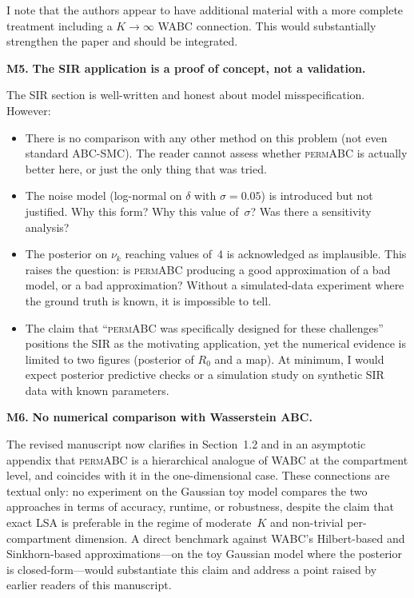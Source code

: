 \documentclass[11pt,a4paper]{article}
\newcommand{\major}[1]{\textbf{\color{red!70!black}M#1.}}
\begin{document}
I note that the authors appear to have additional material with a more complete treatment including a $K \to \infty$ WABC connection. This would substantially strengthen the paper and should be integrated.

\major{5} \textbf{The SIR application is a proof of concept, not a validation.}

The SIR section is well-written and honest about model misspecification. However:
\begin{itemize}[nosep]
    \item There is no comparison with any other method on this problem (not even standard ABC-SMC). The reader cannot assess whether \textsc{permABC} is actually better here, or just the only thing that was tried.
    \item The noise model (log-normal on $\delta$ with $\sigma = 0.05$) is introduced but not justified. Why this form? Why this value of~$\sigma$? Was there a sensitivity analysis?
    \item The posterior on $\nu_k$ reaching values of~4 is acknowledged as implausible. This raises the question: is \textsc{permABC} producing a good approximation of a bad model, or a bad approximation? Without a simulated-data experiment where the ground truth is known, it is impossible to tell.
    \item The claim that ``\textsc{permABC} was specifically designed for these challenges'' positions the SIR as the motivating application, yet the numerical evidence is limited to two figures (posterior of $R_0$ and a map). At minimum, I would expect posterior predictive checks or a simulation study on synthetic SIR data with known parameters.
\end{itemize}

\major{6} \textbf{No numerical comparison with Wasserstein ABC.}

The revised manuscript now clarifies in Section~1.2 and in an asymptotic appendix that \textsc{permABC} is a hierarchical analogue of \textsc{WABC} at the compartment level, and coincides with it in the one-dimensional case. These connections are textual only: no experiment on the Gaussian toy model compares the two approaches in terms of accuracy, runtime, or robustness, despite the claim that exact \textsc{LSA} is preferable in the regime of moderate~$K$ and non-trivial per-compartment dimension. A direct benchmark against \textsc{WABC}'s Hilbert-based and Sinkhorn-based approximations---on the toy Gaussian model where the posterior is closed-form---would substantiate this claim and address a point raised by earlier readers of this manuscript.
\end{document}
